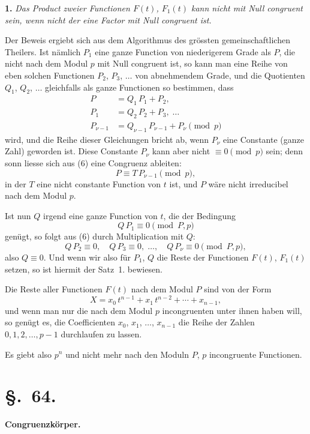 \documentclass[12pt,a4paper]{article}
\newcommand{\sect}[1]{\section*{{\S.~#1.}}\addcontentsline{toc}{section}{\S.~#1}}
\begin{document}
\medskip\noindent
\textbf{1.} \emph{Das Product zweier Functionen $F(t)$, $F_{1}(t)$ kann nicht mit Null congruent sein, wenn nicht der eine Factor mit Null congruent ist.}

Der Beweis ergiebt sich aus dem Algorithmus des grössten gemeinschaftlichen Theilers. Ist nämlich $P_{1}$ eine ganze Function von niederigerem Grade als $P$, die nicht nach dem Modul $p$ mit Null congruent ist, so kann man eine Reihe von eben solchen Functionen $P_{2}$, $P_{3}$, $\ldots$ von abnehmendem Grade, und die Quotienten $Q_{1}$, $Q_{2}$, $\ldots$ gleichfalls als ganze Functionen so bestimmen, dass
\begin{equation}\label{eq:63.6}
\tag{6}
\begin{aligned}
P &= Q_{1}\,P_{1} + P_{2},\\
P_{1} &= Q_{2}\,P_{2} + P_{3},\;\ldots\\
P_{\nu-1} &= Q_{\nu-1}\,P_{\nu-1} + P_{\nu} \pmod{p}
\end{aligned}
\end{equation}
wird, und die Reihe dieser Gleichungen bricht ab, wenn $P_{\nu}$ eine Constante (ganze Zahl) geworden ist. Diese Constante $P_{\nu}$ kann aber nicht $\equiv 0 \pmod{p}$ sein; denn sonn liesse sich aus (6) eine Congruenz ableiten:
\[
P \equiv T\,P_{\nu-1} \pmod{p},
\]
in der $T$ eine nicht constante Function von $t$ ist, und $P$ wäre nicht irreducibel nach dem Modul $p$.

Ist nun $Q$ irgend eine ganze Function von $t$, die der Bedingung
\[
Q\,P_{1} \equiv 0 \pmod{P, p}
\]
genügt, so folgt aus (6) durch Multiplication mit $Q$:
\[
Q\,P_{2} \equiv 0,\quad Q\,P_{3} \equiv 0,\;\ldots,\quad Q\,P_{\nu} \equiv 0 \pmod{P, p},
\]
also $Q \equiv 0$. Und wenn wir also für $P_{1}$, $Q$ die Reste der Functionen $F(t)$, $F_{1}(t)$ setzen, so ist hiermit der Satz~1. bewiesen.

Die Reste aller Functionen $F(t)$ nach dem Modul $P$ sind von der Form
\begin{equation}\label{eq:63.7}
\tag{7}
X = x_{0}\,t^{n-1} + x_{1}\,t^{n-2} + \cdots + x_{n-1},
\end{equation}
und wenn man nur die nach dem Modul $p$ incongruenten unter ihnen haben will, so genügt es, die Coefficienten $x_{0}$, $x_{1}$, $\ldots$, $x_{n-1}$ die Reihe der Zahlen $0, 1, 2, \ldots, p-1$ durchlaufen zu lassen.

Es giebt also $p^{n}$ und nicht mehr nach den Moduln $P$, $p$ incongruente Functionen.

\newpage
\sect{64}
\begin{center}
\textbf{Congruenzkörper.}
\end{center}
\label{sec:64}
\end{document}

